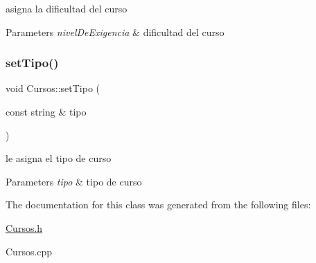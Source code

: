 asigna la dificultad del curso 


\begin{DoxyParams}{Parameters}
{\em nivel\+De\+Exigencia} & dificultad del curso \\
\hline
\end{DoxyParams}
\mbox{\label{classCursos_a96d5a28aef5969efb3f1f93bee013959}} 
\subsubsection{\texorpdfstring{set\+Tipo()}{setTipo()}}
{\footnotesize\ttfamily void Cursos\+::set\+Tipo (\begin{DoxyParamCaption}\item[{const string \&}]{tipo }\end{DoxyParamCaption})}



le asigna el tipo de curso 


\begin{DoxyParams}{Parameters}
{\em tipo} & tipo de curso \\
\hline
\end{DoxyParams}


The documentation for this class was generated from the following files\+:\begin{DoxyCompactItemize}
\item 
\hyperlink{Cursos_8h}{Cursos.\+h}\item 
Cursos.\+cpp\end{DoxyCompactItemize}
